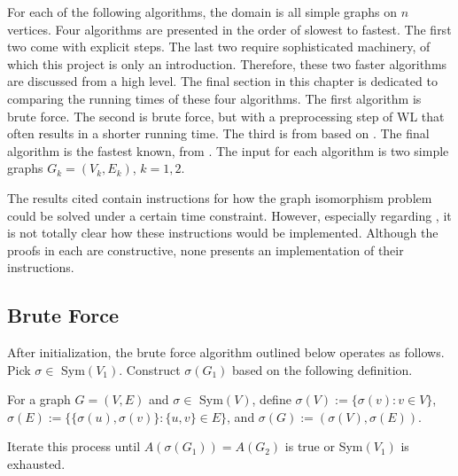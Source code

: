 For each of the following algorithms, the domain is all simple graphs on $n$ vertices. Four algorithms are presented in the order of slowest to fastest. The first two come with explicit steps. The last two require sophisticated machinery, of which this project is only an introduction. Therefore, these two faster algorithms are discussed from a high level. The final section in this chapter is dedicated to comparing the running times of these four algorithms. The first algorithm is brute force. The second is brute force, but with a preprocessing step of WL that often results in a shorter running time. The third is from \cite{babai1983canonical,babai1983computational} based on \cite{luks1982,zemlyachenko1982isomorphism}. The final algorithm is the fastest known, from \cite{babai2016,babai2018}. The input for each algorithm is two simple graphs $G_k=(V_k,E_k)$, $k=1,2$.
\begin{remark}
	 The results cited contain instructions for how the graph isomorphism problem could be solved under a certain time constraint. However, especially regarding \cite{babai2016,babai2018}, it is not totally clear how these instructions would be implemented. Although the proofs in each are constructive, none presents an implementation of their instructions. 
\end{remark}
\subsection{Brute Force}
  After initialization, the brute force algorithm outlined below operates as follows. Pick $\sigma\in$ Sym$(V_1)$. Construct $\sigma(G_1)$ based on the following definition.
	\begin{definition}
		For a graph $G=(V,E)$ and $\sigma\in$ Sym$(V)$, define $\sigma(V):=\{\sigma(v):v\in V\} $, $\sigma(E):=\{\{\sigma(u),\sigma(v)\}:\{u,v\}\in E\}$, and $\sigma(G):=(\sigma(V),\sigma(E))$.
	\end{definition}
	Iterate this process until $A(\sigma(G_1))=A(G_2)$ is true or  Sym$(V_1)$ is exhausted.
	
